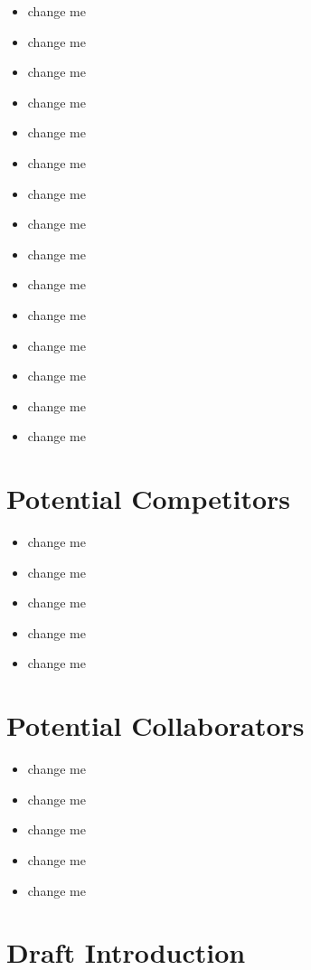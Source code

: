 \documentclass[10pt,letterpaper]{article}
\begin{document}
\begin{itemize}
  \item change me
  \item change me
  \item change me
  \item change me
  \item change me
  \item change me
  \item change me
  \item change me
  \item change me
  \item change me
  \item change me
  \item change me
  \item change me
  \item change me
  \item change me
\end{itemize}


\section{Potential Competitors}


\begin{itemize}
  \item change me
  \item change me
  \item change me
  \item change me
  \item change me
\end{itemize}



\section{Potential Collaborators}


\begin{itemize}
  \item change me
  \item change me
  \item change me
  \item change me
  \item change me
\end{itemize}



\section{Draft Introduction}
\end{document}
